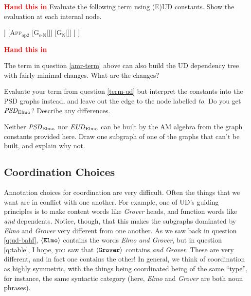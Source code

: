 \documentclass[addpoints
]{exam}
\theoremstyle{definition}
\newcommand{\handin}{\textcolor{red}{\textbf{Hand this in}}}
\newcommand{\apply}[1]{\textsc{App}\ensuremath{_{\text{#1}}}}
\newcommand{\graphname}[2]{\ensuremath{\text{\textit{#1}}_{\text{#2}}}}
\newcommand{\subgraph}[1]{\ensuremath{\langle \text{\texttt{#1}}\rangle}}
\newcommand{\graphconstant}[2]{\ensuremath{\text{G}_{\text{#1}}}[\text{#2}]}
\begin{document}
\begin{questions}
\begin{parts}
\end{parts}


\question[2] \handin
Evaluate the following term using (E)UD constants. Show the evaluation at each internal node. 

\begin{forest}
  [\apply{op1}
    [\graphconstant{N}{Elmo}]
    [\apply{op2}
      [\graphconstant{c-N}{and}]
      [\graphconstant{N}{Grover}]
    ]
  ]
\end{forest}


\question[2] \handin
\label{term-ud}

The term in question \ref{amr-term} above can also build the UD dependency tree with fairly minimal changes. What are the changes? 

\question[3] Evaluate your term from question \ref{term-ud} but interpret the constants into the PSD graphs instead, and leave out the edge to the node labelled \textit{to}. Do you get \graphname{PSD}{Elmo}? Describe any differences.

\begin{solution}

 
\end{solution}


\question[4]

Neither \graphname{PSD}{Elmo} nor \graphname{EUD}{Elmo} can be built by the AM algebra from the graph constants provided here. Draw one subgraph of one of the graphs that can't be built, and explain why not.

\begin{solution}

 
\end{solution}


\subsection{Coordination Choices}

  \question[10] Annotation choices for coordination are very difficult. Often the things that we want are in conflict with one another. For example, one of UD's guiding principles is to make content words like \textit{Grover} heads, and function words like \textit{and} dependents. Notice, though, that this makes the subgraphs dominated by \textit{Elmo} and \textit{Grover} very different from one another. As we saw back in question \ref{q:ud-bahf}, \subgraph{\texttt{Elmo}} contains the words \textit{Elmo and Grover}, but in question \ref{q:table}, I hope, you saw that \subgraph{Grover} contains \textit{and Grover}. These are very different, and in fact one contains the other! In general, we think of coordination as highly symmetric, with the things being coordinated being of the same ``type'', for instance, the same syntactic category (here, \textit{Elmo} and \textit{Grover} are both noun phrases). 


\end{questions}
\end{document}
